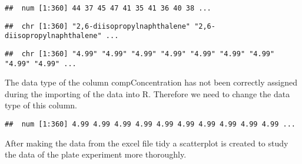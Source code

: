 \documentclass[
]{book}
\newenvironment{Shaded}{\begin{snugshade}}{\end{snugshade}}
\newcommand{\AttributeTok}[1]{\textcolor[rgb]{0.77,0.63,0.00}{#1}}
\newcommand{\CommentTok}[1]{\textcolor[rgb]{0.56,0.35,0.01}{\textit{#1}}}
\newcommand{\FunctionTok}[1]{\textcolor[rgb]{0.00,0.00,0.00}{#1}}
\newcommand{\NormalTok}[1]{#1}
\newcommand{\OtherTok}[1]{\textcolor[rgb]{0.56,0.35,0.01}{#1}}
\newcommand{\SpecialCharTok}[1]{\textcolor[rgb]{0.00,0.00,0.00}{#1}}
\begin{document}
\begin{verbatim}
##  num [1:360] 44 37 45 47 41 35 41 36 40 38 ...
\end{verbatim}

\begin{Shaded}
\end{Shaded}

\begin{verbatim}
##  chr [1:360] "2,6-diisopropylnaphthalene" "2,6-diisopropylnaphthalene" ...
\end{verbatim}

\begin{Shaded}
\end{Shaded}

\begin{verbatim}
##  chr [1:360] "4.99" "4.99" "4.99" "4.99" "4.99" "4.99" "4.99" "4.99" "4.99" ...
\end{verbatim}

The data type of the column compConcentration has not been correctly assigned during the importing of the data into R. Therefore we need to change the data type of this column.

\begin{Shaded}
\end{Shaded}

\begin{verbatim}
##  num [1:360] 4.99 4.99 4.99 4.99 4.99 4.99 4.99 4.99 4.99 4.99 ...
\end{verbatim}

After making the data from the excel file tidy a scatterplot is created to study the data of the plate experiment more thoroughly.
\end{document}
